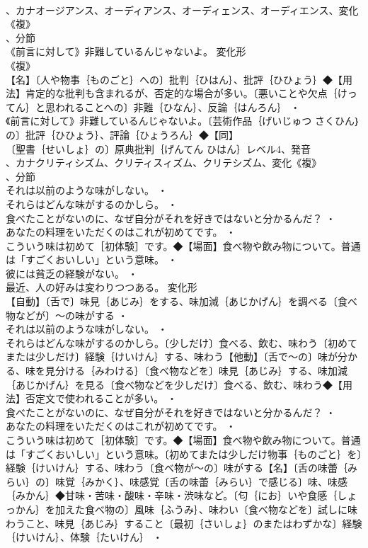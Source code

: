 \documentclass[8pt]{extreport}
\begin{document}
\begin{CJK}{UTF8}{min}
\\	、カナオージアンス、オーディアンス、オーディェンス、オーディエンス、変化《複》
\\	、分節
\\	《前言に対して》非難しているんじゃないよ。	変化形 
\\	《複》
\\	【名】〔人や物事｛ものごと｝への〕批判｛ひはん｝、批評｛ひひょう｝◆【用法】肯定的な批判も含まれるが、否定的な場合が多い。〔悪いことや欠点｛けってん｝と思われることへの〕非難｛ひなん｝、反論｛はんろん｝ ・
\\	《前言に対して》非難しているんじゃないよ。〔芸術作品｛げいじゅつ さくひん｝の〕批評｛ひひょう｝、評論｛ひょうろん｝◆【同】
\\	〔聖書｛せいしょ｝の〕原典批判｛げんてん ひはん｝レベル4、発音
\\	、カナクリティシズム、クリティスィズム、クリテシズム、変化《複》
\\	、分節
\\	それは以前のような味がしない。 ・
\\	それらはどんな味がするのかしら。 ・
\\	食べたことがないのに、なぜ自分がそれを好きではないと分かるんだ？ ・
\\	あなたの料理をいただくのはこれが初めてです。 ・
\\	こういう味は初めて［初体験］です。◆【場面】食べ物や飲み物について。普通は「すごくおいしい」という意味。 ・
\\	彼には貧乏の経験がない。 ・
\\	最近、人の好みは変わりつつある。	変化形 
\\	【自動】〔舌で〕味見｛あじみ｝をする、味加減｛あじかげん｝を調べる〔食べ物などが〕～の味がする ・
\\	それは以前のような味がしない。 ・
\\	それらはどんな味がするのかしら。〔少しだけ〕食べる、飲む、味わう〔初めてまたは少しだけ〕経験｛けいけん｝する、味わう【他動】〔舌で～の〕味が分かる、味を見分ける｛みわける｝〔食べ物などを〕味見｛あじみ｝する、味加減｛あじかげん｝を見る〔食べ物などを少しだけ〕食べる、飲む、味わう◆【用法】否定文で使われることが多い。 ・
\\	食べたことがないのに、なぜ自分がそれを好きではないと分かるんだ？ ・
\\	あなたの料理をいただくのはこれが初めてです。 ・
\\	こういう味は初めて［初体験］です。◆【場面】食べ物や飲み物について。普通は「すごくおいしい」という意味。〔初めてまたは少しだけ物事｛ものごと｝を〕経験｛けいけん｝する、味わう〔食べ物が～の〕味がする【名】〔舌の味蕾｛みらい｝の〕味覚｛みかく｝、味感覚〔舌の味蕾｛みらい｝で感じる〕味、味感｛みかん｝◆甘味・苦味・酸味・辛味・渋味など。〔匂｛にお｝いや食感｛しょっかん｝を加えた食べ物の〕風味｛ふうみ｝、味わい〔食べ物などを〕試しに味わうこと、味見｛あじみ｝すること〔最初｛さいしょ｝のまたはわずかな〕経験｛けいけん｝、体験｛たいけん｝ ・

\end{CJK}
\end{document}
